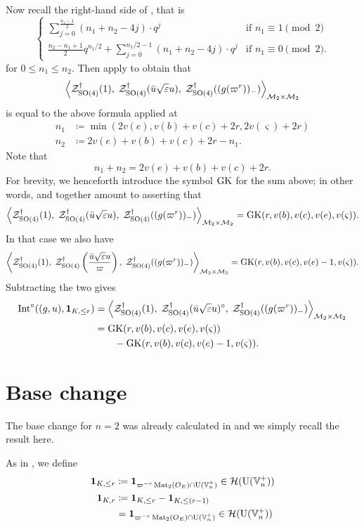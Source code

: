 Now recall the right-hand side of , that is
\[
  \begin{cases}
    \sum_{j=0}^{\frac{n_1-1}{2}} (n_1+n_2-4j) \cdot q^j & \text{if } n_1 \equiv 1 \pmod 2 \\
    \frac{n_2-n_1+1}{2} q^{n_1/2} + \sum_{j=0}^{n_1/2-1} (n_1+n_2-4j) \cdot q^j & \text{if } n_1 \equiv 0 \pmod 2.
  \end{cases}
\]
for $0 \le n_1 \le n_2$.
Then apply  to obtain that
\[
  \left< \mathcal Z^{\dagger}_{\operatorname{SO}(4)}(1), \;
    \mathcal Z^{\dagger}_{\operatorname{SO}(4)}(\bar u \sqrt{\varepsilon} u), \;
    \mathcal Z^{\dagger}_{\operatorname{SO}(4)}((g(\varpi^r))_-) \right>_{\mathcal M_2 \times \mathcal M_2}
\]
is equal to the above formula applied at
\begin{align*}
  n_1 &\coloneqq \min(2v(e), v(b)+v(c)+2r, 2v(\varsigma)+2r) \\
  n_2 &\coloneqq 2v(e) + v(b) + v(c) + 2r - n_1.
\end{align*}
Note that
\[ n_1 + n_2 = 2v(e) + v(b) + v(c) + 2r. \]
For brevity, we henceforth introduce the symbol $\operatorname{GK}$ for the sum above;
in other words,  and 
together amount to asserting that
\[ \left< \mathcal Z^{\dagger}_{\operatorname{SO}(4)}(1), \; \mathcal Z^{\dagger}_{\operatorname{SO}(4)}(\bar u \sqrt{\varepsilon} u), \; \mathcal Z^{\dagger}_{\operatorname{SO}(4)}((g(\varpi^r))_-) \right>_{\mathcal M_2 \times \mathcal M_2}
    = \operatorname{GK}(r, v(b), v(c), v(e), v(\varsigma)). \]
In that case we also have
\[
  \left< \mathcal Z^{\dagger}_{\operatorname{SO}(4)}(1), \;
    \mathcal Z^{\dagger}_{\operatorname{SO}(4)}\left(\frac{\bar u \sqrt{\varepsilon} u}{\varpi}\right), \;
    \mathcal Z^{\dagger}_{\operatorname{SO}(4)}((g(\varpi^r))_-) \right>_{\mathcal M_2 \times \mathcal M_2}
    = \operatorname{GK}(r, v(b), v(c), v(e)-1, v(\varsigma)). \]
Subtracting the two gives
\begin{equation}
  \begin{aligned}
    \operatorname{Int}^\circ((g,u), \mathbf{1}_{K, \le r}) &=
      \left< \mathcal Z^{\dagger}_{\operatorname{SO}(4)}(1), \;
        \mathcal Z^{\dagger}_{\operatorname{SO}(4)}(\bar u \sqrt{\varepsilon} u)^\circ, \;
        \mathcal Z^{\dagger}_{\operatorname{SO}(4)}((g(\varpi^r))_-) \right>_{\mathcal M_2 \times \mathcal M_2} \\
    &= \operatorname{GK}(r, v(b), v(c), v(e), v(\varsigma)) \\
    &\qquad- \operatorname{GK}(r, v(b), v(c), v(e)-1, v(\varsigma)).
  \end{aligned}
  \label{eq:int_subtract}
\end{equation}

\section{Base change}
\label{sec:finale_base_change}
The base change for $n=2$ was already calculated in \cite{ref:AFLspherical}
and we simply recall the result here.

As in , we define
\begin{align*}
  \mathbf{1}_{K, \le r} &\coloneqq \mathbf{1}_{\varpi^{-r} \operatorname{Mat}_2(O_E) \cap \operatorname{U}(\mathbb V_n^+)} \in \mathcal H(\operatorname{U}(\mathbb V_n^+)) \\
  \mathbf{1}_{K, r} &\coloneqq \mathbf{1}_{K, \le r} - \mathbf{1}_{K, \le (r-1)} \\
  &= \mathbf{1}_{\varpi^{-r} \operatorname{Mat}_2(O_E) \cap \operatorname{U}(\mathbb V_n^+)} \in \mathcal H(\operatorname{U}(\mathbb V_n^+)) \\
\end{align*}

